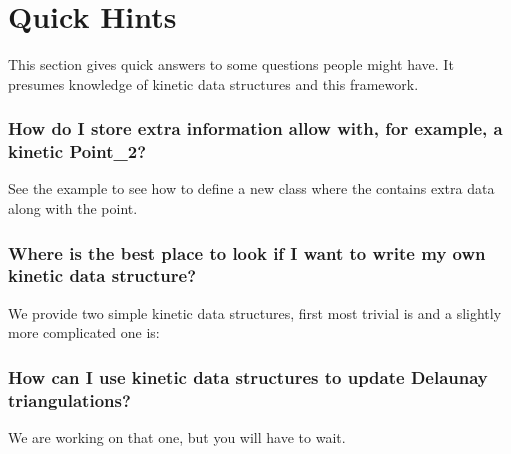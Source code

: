\section{Quick Hints \label{sec:quick_hints}}

This section gives quick answers to some questions people might have.
It presumes knowledge of kinetic data structures and this framework.

\subsubsection{How do I store extra information allow with, for example, a kinetic Point\_2?}

See the example
 to see how
to define a new  class where the
 contains extra data along with the point.

\subsubsection{Where is the best place to look if I want to write my own kinetic data structure?}
We provide two simple kinetic data structures, first most trivial is
 and a slightly more
complicated one is:


\subsubsection{How can I use kinetic data structures to update Delaunay triangulations?}
We are working on that one, but you will have to wait.



